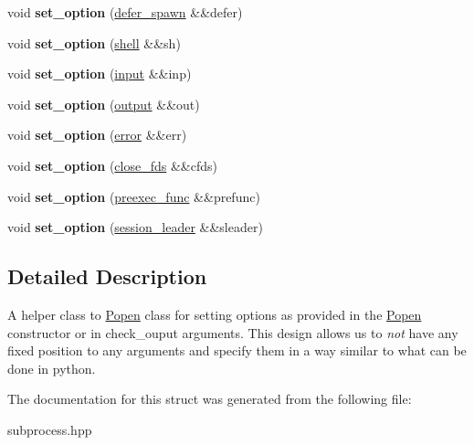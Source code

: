 \begin{DoxyCompactItemize}
void {\bfseries set\+\_\+option} (\hyperlink{structsubprocess_1_1defer__spawn}{defer\+\_\+spawn} \&\&defer)
\item 
\mbox{\label{structsubprocess_1_1detail_1_1ArgumentDeducer_a19713166253d051b544b9074fe0b2927}} 
void {\bfseries set\+\_\+option} (\hyperlink{structsubprocess_1_1shell}{shell} \&\&sh)
\item 
\mbox{\label{structsubprocess_1_1detail_1_1ArgumentDeducer_adf623faeac02bb0597cd520c7434af21}} 
void {\bfseries set\+\_\+option} (\hyperlink{structsubprocess_1_1input}{input} \&\&inp)
\item 
\mbox{\label{structsubprocess_1_1detail_1_1ArgumentDeducer_a07566b83561f598e4b48ed19c3f3d165}} 
void {\bfseries set\+\_\+option} (\hyperlink{structsubprocess_1_1output}{output} \&\&out)
\item 
\mbox{\label{structsubprocess_1_1detail_1_1ArgumentDeducer_a17c8abcd9680472fbbc0459ff594f30e}} 
void {\bfseries set\+\_\+option} (\hyperlink{structsubprocess_1_1error}{error} \&\&err)
\item 
\mbox{\label{structsubprocess_1_1detail_1_1ArgumentDeducer_afae19ddffec846c8ce3147465e0cd439}} 
void {\bfseries set\+\_\+option} (\hyperlink{structsubprocess_1_1close__fds}{close\+\_\+fds} \&\&cfds)
\item 
\mbox{\label{structsubprocess_1_1detail_1_1ArgumentDeducer_abddc5d25affe64e7fb09e24607e07fb8}} 
void {\bfseries set\+\_\+option} (\hyperlink{classsubprocess_1_1preexec__func}{preexec\+\_\+func} \&\&prefunc)
\item 
\mbox{\label{structsubprocess_1_1detail_1_1ArgumentDeducer_af1a268113c7212b740e7b324100d3ad0}} 
void {\bfseries set\+\_\+option} (\hyperlink{structsubprocess_1_1session__leader}{session\+\_\+leader} \&\&sleader)
\end{DoxyCompactItemize}


\subsection{Detailed Description}
A helper class to \hyperlink{classsubprocess_1_1Popen}{Popen} class for setting options as provided in the \hyperlink{classsubprocess_1_1Popen}{Popen} constructor or in check\+\_\+ouput arguments. This design allows us to {\itshape not} have any fixed position to any arguments and specify them in a way similar to what can be done in python. 

The documentation for this struct was generated from the following file\+:\begin{DoxyCompactItemize}
\item 
subprocess.\+hpp\end{DoxyCompactItemize}
